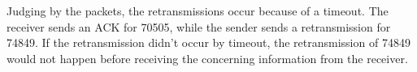 

Judging by the packets, the retransmissions occur because of a timeout. The receiver sends an ACK for 70505, while the sender sends a retransmission for 74849. If the retransmission didn't occur by timeout, the retransmission of 74849 would not happen before receiving the concerning information from the receiver.
